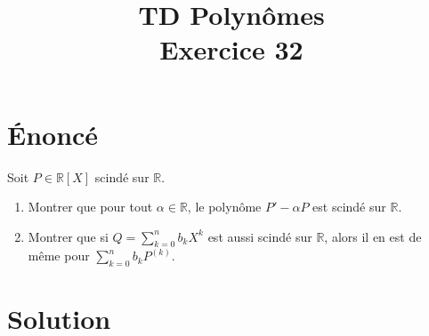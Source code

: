 \documentclass[french]{article}
\title{TD Polynômes \\ Exercice 32}
\date{}
\newcommand{\R}{\mathbb{R}}
\begin{document}
\maketitle

\section{Énoncé}
Soit $P\in\R[X]$ scindé sur $\R$.
\begin{enumerate}
	\item Montrer que pour tout $\alpha\in\R$, le polynôme $P'-\alpha P$ est scindé sur $\R$.
	\item Montrer que si $Q=\displaystyle\sum_{k=0}^{n}b_kX^k$ est aussi scindé sur $\R$, alors il en est de même pour $\displaystyle\sum_{k=0}^{n}b_kP^{(k)}$.
\end{enumerate}
\section{Solution}
\end{document}

